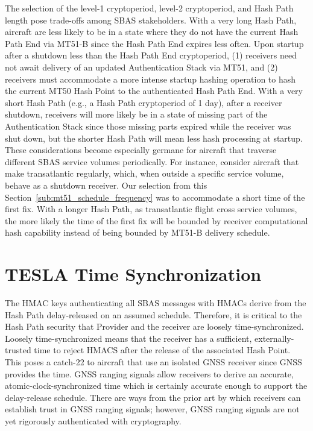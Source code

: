\documentclass[letterpaper,times]{IONconf/IONconf}
\begin{document}
		The selection of the level-1 cryptoperiod, level-2 cryptoperiod, and Hash Path length pose trade-offs among SBAS stakeholders.
		With a very long Hash Path, aircraft are less likely to be in a state where they do not have the current Hash Path End via MT51-B since the Hash Path End expires less often.
		Upon startup after a shutdown less than the Hash Path End cryptoperiod, (1) receivers need not await delivery of an updated Authentication Stack via MT51, and (2) receivers must accommodate a more intense startup hashing operation to hash the current MT50 Hash Point to the authenticated Hash Path End.
		With a very short Hash Path (e.g., a Hash Path cryptoperiod of 1 day), after a receiver shutdown, receivers will more likely be in a state of missing part of the Authentication Stack since those missing parts expired while the receiver was shut down, but the shorter Hash Path will mean less hash processing at startup.
		These considerations become especially germane for aircraft that traverse different SBAS service volumes periodically.
		For instance, consider aircraft that make transatlantic regularly, which, when outside a specific service volume, behave as a shutdown receiver.
		Our selection from this Section~\ref{sub:mt51_schedule_frequency} was to accommodate a short time of the first fix.
		With a longer Hash Path, as transatlantic flight cross service volumes, the more likely the time of the first fix will be bounded by receiver computational hash capability instead of being bounded by MT51-B delivery schedule.

\section{TESLA Time Synchronization} \label{sec:tesla_time_synchronization}

	The HMAC keys authenticating all SBAS messages with HMACs derive from the Hash Path delay-released on an assumed schedule.
	Therefore, it is critical to the Hash Path security that Provider and the receiver are loosely time-synchronized.
	Loosely time-synchronized means that the receiver has a sufficient, externally-trusted time to reject HMACS after the release of the associated Hash Point.
	This poses a catch-22 to aircraft that use an isolated GNSS receiver since GNSS provides the time.
	GNSS ranging signals allow receivers to derive an accurate, atomic-clock-synchronized time which is certainly accurate enough to support the delay-release schedule.
	There are ways from the prior art by which receivers can establish trust in GNSS ranging signals\cite{Psiaki2016, Fernandez-Hernandez2018}; however, GNSS ranging signals are not yet rigorously authenticated with cryptography.
\end{document}
